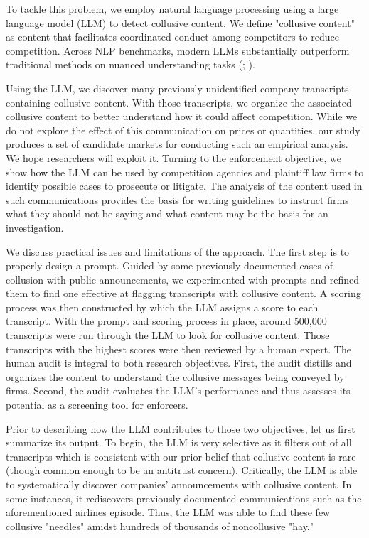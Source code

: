 To tackle this problem, we employ natural language processing using a large language model (LLM) to detect collusive content.
We define "collusive content" 
as content that facilitates coordinated conduct among competitors to reduce competition. 
Across NLP benchmarks, modern LLMs substantially outperform traditional methods on nuanced understanding tasks (\textcite{brown2020language}; \textcite{openai2023gpt4}).

Using the LLM, we discover many previously unidentified company transcripts containing collusive content. With those 
transcripts, we organize the associated collusive content to better understand how it could 
affect competition. While we do not explore the effect of this communication on prices or quantities, our study 
produces a set of candidate markets for conducting such an empirical analysis. 
We hope researchers will exploit it. Turning to the enforcement objective, we show how the LLM can be used by 
competition agencies and plaintiff law firms to identify possible cases to prosecute or litigate.  
The analysis of the content used in such communications provides the basis for writing guidelines to instruct 
firms what they should not be saying and what content may be the basis for an investigation.


We discuss practical issues and limitations of the approach. The first step is to properly design a prompt. Guided 
by some previously documented cases of collusion with public announcements, we experimented 
with prompts and refined them to find one effective at flagging transcripts with collusive content. A scoring 
process was then constructed by which the LLM assigns a score to each transcript. With the prompt 
and scoring process in place, around 500,000 transcripts were run through the LLM to look for collusive 
content. Those transcripts with the highest scores were then reviewed by a human expert. The human audit 
is integral to both research objectives. First, the audit distills and organizes the content to 
understand the collusive messages being conveyed by firms. Second, the audit evaluates the LLM's performance 
and thus assesses its potential as a screening tool for enforcers.

Prior to describing how the LLM contributes to those two objectives, let us first summarize its output. 
To begin, the LLM is very selective as it filters out  of all transcripts which is consistent 
with our prior belief that collusive content is rare (though common enough to be an antitrust concern). 
Critically, the LLM is able to systematically discover companies' announcements with collusive content. 
In some instances, it rediscovers previously documented communications such as the aforementioned 
airlines episode. Thus, the LLM was able to find these few collusive "needles" amidst hundreds of 
thousands of noncollusive "hay."  

